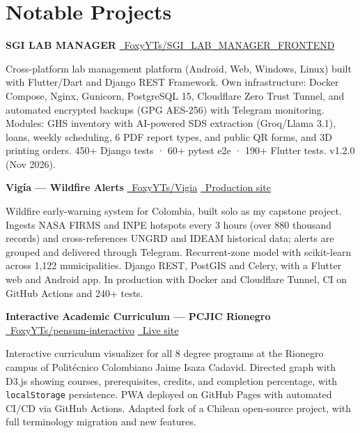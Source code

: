 \documentclass[11pt, a4paper]{article}
\begin{document}
\section{Notable Projects}

\noindent\textbf{\color{primary}SGI LAB MANAGER} \hfill
\href{https://github.com/FoxyYTs/SGI_LAB_MANAGER_FRONTEND}{\small\faGithub\ FoxyYTs/SGI\_LAB\_MANAGER\_FRONTEND}

Cross-platform lab management platform (Android, Web, Windows, Linux) built with
Flutter/Dart and Django REST Framework. Own infrastructure: Docker Compose, Nginx,
Gunicorn, PostgreSQL 15, Cloudflare Zero Trust Tunnel, and automated encrypted backups
(GPG AES-256) with Telegram monitoring. Modules: GHS inventory with AI-powered SDS
extraction (Groq/Llama 3.1), loans, weekly scheduling, 6 PDF report types, and public
QR forms, and 3D printing orders. 450+ Django tests · 60+ pytest e2e · 190+ Flutter tests.
v1.2.0 (Nov 2026).

\vspace{6pt}
\noindent\textbf{\color{primary}Vigía — Wildfire Alerts} \hfill
\href{https://github.com/FoxyYTs/Vigia}{\small\faGithub\ FoxyYTs/Vigia} \quad
\href{https://vigia.foxyyts.qzz.io}{\small\faGlobe\ Production site}

Wildfire early-warning system for Colombia, built solo as my capstone project. Ingests
NASA FIRMS and INPE hotspots every 3 hours (over 880 thousand records) and cross-references
UNGRD and IDEAM historical data; alerts are grouped and delivered through Telegram.
Recurrent-zone model with scikit-learn across 1,122 municipalities. Django REST, PostGIS
and Celery, with a Flutter web and Android app. In production with Docker and Cloudflare
Tunnel, CI on GitHub Actions and 240+ tests.

\vspace{6pt}
\noindent\textbf{\color{primary}Interactive Academic Curriculum — PCJIC Rionegro} \hfill
\href{https://github.com/FoxyYTs/pensum-interactivo}{\small\faGithub\ FoxyYTs/pensum-interactivo} \quad
\href{https://foxyyts.github.io/pensum-interactivo}{\small\faGlobe\ Live site}

Interactive curriculum visualizer for all 8 degree programs at the Rionegro campus of
Politécnico Colombiano Jaime Isaza Cadavid. Directed graph with D3.js showing courses,
prerequisites, credits, and completion percentage, with \texttt{localStorage} persistence.
PWA deployed on GitHub Pages with automated CI/CD via GitHub Actions. Adapted fork of a
Chilean open-source project, with full terminology migration and new features.
\end{document}
